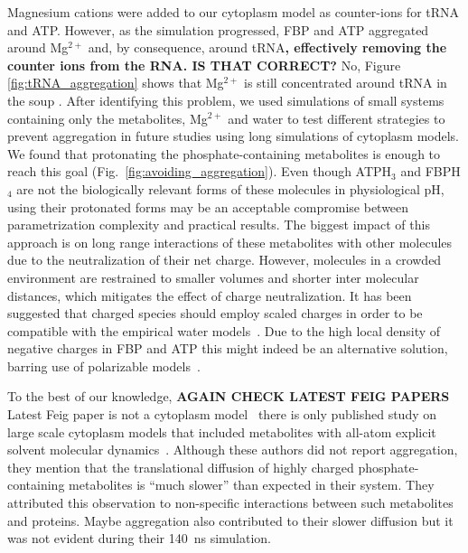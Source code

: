\documentclass[journal=jcisd8,manuscript=article]{achemso}
\begin{document}
Magnesium cations were added to our cytoplasm model as counter-ions
for tRNA and ATP. However, as the simulation progressed, FBP and ATP
aggregated around Mg$^{2+}$ and, by consequence, around tRNA{\bf,
  effectively removing the counter ions from the RNA. IS THAT
  CORRECT?} {\color{blue} No, Figure \ref{fig:tRNA_aggregation} shows that Mg$^{2+}$ is still concentrated around tRNA in the soup }. After identifying this problem, we used simulations of
small systems containing only the metabolites, Mg$^{2+}$ and water to
test different strategies to prevent aggregation in future studies
using long simulations of cytoplasm models. We found that protonating
the phosphate-containing metabolites is enough to reach this goal
(Fig.~\ref{fig:avoiding_aggregation}). Even though ATPH$_3$ and
FBPH$_4$ are not the biologically relevant forms of these molecules in
physiological pH, using their protonated forms may be an acceptable
compromise between parametrization complexity and practical
results. The biggest impact of this approach is on long range
interactions of these metabolites with other molecules due to the
neutralization of their net charge. However, molecules in a crowded
environment are restrained to smaller volumes and shorter inter
molecular distances, which mitigates the effect of charge
neutralization. It has been suggested that charged species should
employ scaled charges in order to be compatible with the empirical
water models~\cite{Leontyev2009a,Leontyev2011a}. Due to the high local
density of negative charges in FBP and ATP this might indeed be an
alternative solution, barring use of polarizable
models~\cite{Ponder2010a,Lopes2013a,Ghahremanpour2018b,Walz2018a}.


To the best of our knowledge, {\bf AGAIN CHECK LATEST FEIG PAPERS} {\color{blue} Latest Feig paper is not a cytoplasm model~\cite{nawrocki2019}}
there is only published study on large scale cytoplasm models that
included metabolites with all-atom explicit solvent molecular
dynamics~\cite{Yu2016a}. Although these authors did not report
aggregation, they mention that the translational diffusion of highly
charged phosphate-containing metabolites is ``much slower'' than
expected in their system. They attributed this observation to
non-specific interactions between such metabolites and proteins. Maybe
aggregation also contributed to their slower diffusion but it was not
evident during their \SI{140}{\nano\second} simulation.

\end{document}
